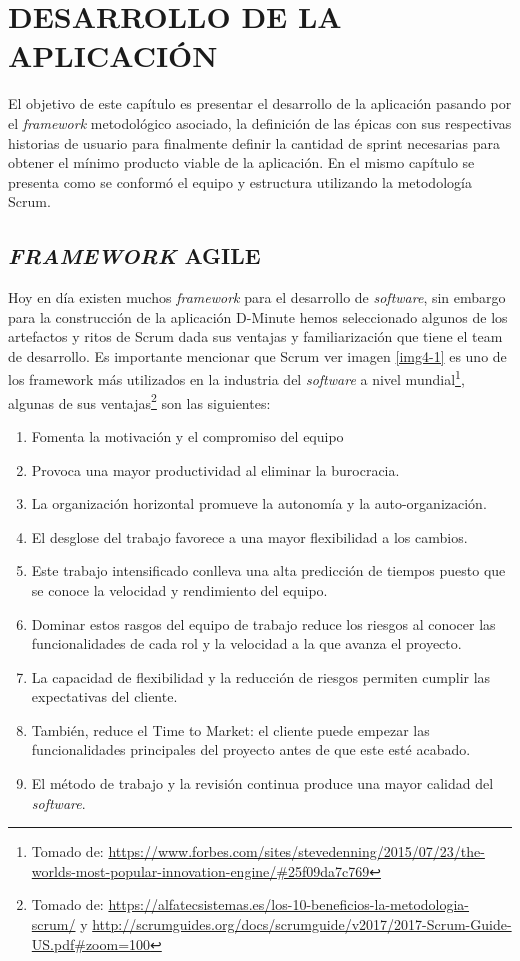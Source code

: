 \section{DESARROLLO DE LA APLICACIÓN}

El objetivo de este capítulo es presentar el desarrollo de la aplicación pasando por el \textit{framework} metodológico asociado, la definición de las épicas con sus respectivas historias de usuario para finalmente definir la cantidad de sprint necesarias para obtener el mínimo producto viable de la aplicación. En el mismo capítulo se presenta como se conformó el equipo y estructura utilizando la metodología Scrum. 

\subsection{\textit{FRAMEWORK} AGILE}

Hoy en día existen muchos \textit{framework} para el desarrollo de \textit{software}, sin embargo para la construcción de la aplicación D-Minute hemos seleccionado algunos de los artefactos y ritos de Scrum  dada sus ventajas y familiarización que tiene el team de desarrollo. Es importante mencionar que Scrum ver imagen \ref{img4-1} es uno de los framework más utilizados en la industria del \textit{software} a nivel mundial\footnote{Tomado de: \url{https://www.forbes.com/sites/stevedenning/2015/07/23/the-worlds-most-popular-innovation-engine/\#25f09da7c769}}, algunas de sus ventajas\footnote{Tomado de: \url{https://alfatecsistemas.es/los-10-beneficios-la-metodologia-scrum/} y \url{http://scrumguides.org/docs/scrumguide/v2017/2017-Scrum-Guide-US.pdf\#zoom=100}} son las siguientes:

\begin{enumerate}[1.]
    \item Fomenta la motivación y el compromiso del equipo 
    \item Provoca una mayor productividad al eliminar la burocracia.
    \item La organización horizontal promueve la autonomía y la auto-organización.
    \item El desglose del trabajo favorece a una mayor flexibilidad a los cambios. 
    \item Este trabajo intensificado conlleva una alta predicción de tiempos puesto que se conoce la velocidad y rendimiento del equipo.
    \item Dominar estos rasgos del equipo de trabajo reduce los riesgos al conocer las funcionalidades de cada rol y la velocidad a la que avanza el proyecto.
    \item La capacidad de flexibilidad y la reducción de riesgos permiten cumplir las expectativas del cliente.
    \item También, reduce el Time to Market: el cliente puede empezar las funcionalidades principales del proyecto antes de que este esté acabado.
    \item El método de trabajo y la revisión continua produce una mayor calidad del \textit{software}.

\end{enumerate}

